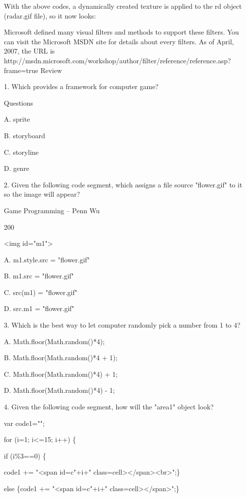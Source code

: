 \documentclass[
]{article}
\begin{document}
With the above codes, a dynamically created texture is applied to the rd
object (radar.gif file), so it now looks:

Microsoft defined many visual filters and methods to support these
filters. You can visit the Microsoft MSDN site for details about every
filters. As of April, 2007, the URL is
http://msdn.microsoft.com/workshop/author/filter/reference/reference.asp?frame=true
Review

1. Which provides a framework for computer game?

Questions

A. sprite

B. storyboard

C. storyline

D. genre

2. Given the following code segment, which assigns a file source
"flower.gif" to it so the image will appear?

Game Programming -- Penn Wu

200

\protect\hypertarget{index_split_011.htmlux5cux23p201}{}{}

\textless img id="m1"\textgreater{}

A. m1.style.src = "flower.gif"

B. m1.src = "flower.gif"

C. src(m1) = "flower.gif"

D. src.m1 = "flower.gif"

3. Which is the best way to let computer randomly pick a number from 1
to 4?

A. Math.floor(Math.random()*4);

B. Math.floor(Math.random()*4 + 1);

C. Math.floor(Math.random()*4) + 1;

D. Math.floor(Math.random()*4) - 1;

4. Given the following code segment, how will the "area1" object look?

var code1="";

for (i=1; i\textless=15; i++) \{

if (i\%3==0) \{

code1 += "\textless span id=c"+i+"
class=\textquotesingle cell\textquotesingle\textgreater\textless/span\textgreater\textless br\textgreater";\}

else \{code1 += "\textless span id=c"+i+"
class=\textquotesingle cell\textquotesingle\textgreater\textless/span\textgreater";\}
\end{document}
